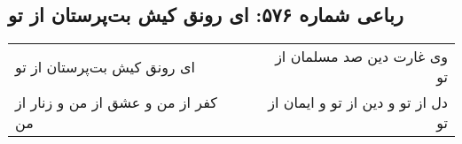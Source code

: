 \begin{center}
\section*{رباعی شماره ۵۷۶: ای رونق کیش بت‌پرستان از تو}
\label{sec:sh576}
\begin{longtable}{l p{0.5cm} r}
ای رونق کیش بت‌پرستان از تو
&&
وی غارت دین صد مسلمان از تو
\\
کفر از من و عشق از من و زنار از من
&&
دل از تو و دین از تو و ایمان از تو
\\
\end{longtable}
\end{center}
